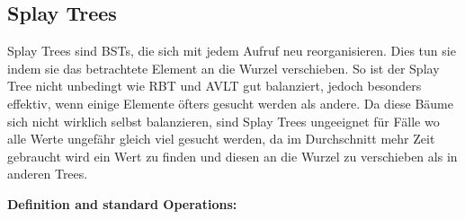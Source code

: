 \documentclass[
../AuD-Zusammenfassung.tex,
]
{subfiles}
\begin{document}

\subsection{Splay Trees}
Splay Trees sind BSTs, die sich mit jedem Aufruf neu reorganisieren. Dies tun sie indem sie das betrachtete Element an die Wurzel verschieben. So ist der Splay Tree nicht unbedingt wie RBT und AVLT gut balanziert, jedoch besonders effektiv, wenn einige Elemente öfters gesucht werden als andere. Da diese Bäume sich nicht wirklich selbst balanzieren, sind Splay Trees ungeeignet für Fälle wo alle Werte ungefähr gleich viel gesucht werden, da im Durchschnitt mehr Zeit gebraucht wird ein Wert zu finden und diesen an die Wurzel zu verschieben als in anderen Trees.

\textbf{Definition and standard Operations:}

\begin{algorithm}[H]
\end{algorithm}
\end{document}
